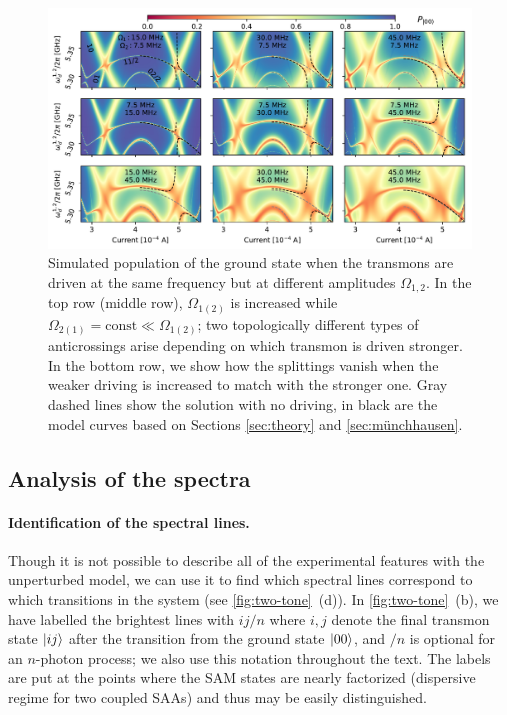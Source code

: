 \documentclass[%
 prx,
 amsmath,amssymb,
 reprint,%
]{revtex4-1}
\begin{document}
\begin{figure}
	\centering
	\includegraphics[width=\linewidth]{topological_splittings}
	\caption{Simulated population of the ground state when the transmons are driven at the same frequency but at different amplitudes $\Omega_{1,2}$. In the top row (middle row), $\Omega_{1(2)}$ is increased while $\Omega_{2(1)} = \text{const} \ll \Omega_{1(2)}$; two topologically different types of anticrossings arise depending on which transmon is driven stronger. In the bottom row, we show how the splittings vanish when the weaker driving is increased to match with the stronger one. Gray dashed lines show the solution with no driving, in black are the model curves based on Sections \ref{sec:theory} and \ref{sec:münchhausen}.}
	\label{fig:difdrive}
\end{figure}


\subsection{Analysis of the spectra} \label{sec:analysis}

\paragraph{Identification of the spectral lines.} Though it is not possible to describe all of the experimental features with the unperturbed model, we can use it to find which spectral lines correspond to which transitions in the system (see \autoref{fig:two-tone}~(d)). In \autoref{fig:two-tone}~(b), we have labelled the brightest lines with $ij/n$ where $i,j$ denote the final transmon state $\ket{ij}$ after the transition from the ground state $\ket{00}$, and $/n$ is optional for an $n$-photon process; we also use this notation throughout the text. The labels are put at the points where the SAM states are nearly factorized (dispersive regime for two coupled SAAs) and thus may be easily distinguished.
\end{document}
